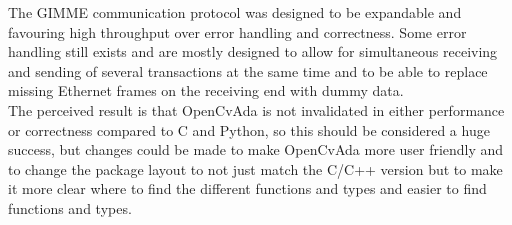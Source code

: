 The GIMME communication protocol was designed to be expandable and favouring high throughput over error handling and correctness. Some error handling still exists and are mostly designed to allow for simultaneous receiving and sending of several transactions at the same time and to be able to replace missing Ethernet frames on the receiving end with dummy data.
\\
The perceived result is that OpenCvAda is not invalidated in either performance or correctness compared to C and Python, so this should be considered a huge success, but changes could be made to make OpenCvAda more user friendly and to change the package layout to not just match the C/C++ version but to make it more clear where to find the different functions and types and easier to find functions and types. 